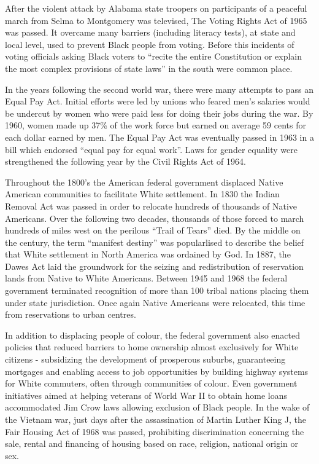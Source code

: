 After the violent attack by Alabama state troopers on participants of a peaceful march from Selma to Montgomery was televised, The Voting Rights Act of 1965 was passed. It overcame many barriers (including literacy tests), at state and local level, used to prevent Black people from voting. Before this incidents of voting officials asking Black voters to ``recite the entire Constitution or explain the most complex provisions of state laws''\cite{LBJ} in the south were common place.

In the years following the second world war, there were many attempts to pass an Equal Pay Act. Initial efforts were led by unions who feared men's salaries would be undercut by women who were paid less for doing their jobs during the war. By 1960, women made up 37\% of the work force but earned on average 59 cents for each dollar earned by men. The Equal Pay Act was eventually passed in 1963 in a bill which endorsed ``equal pay for equal work''. Laws for gender equality were strengthened the following year by the Civil Rights Act of 1964.

Throughout the 1800's the American federal government displaced Native American communities to facilitate White settlement. In 1830 the Indian Removal Act was passed in order to relocate hundreds of thousands of Native Americans. Over the following two decades, thousands of those forced to march hundreds of miles west on the perilous ``Trail of Tears'' died. By the middle on the century, the term ``manifest destiny'' was popularlised to describe the belief that White settlement in North America was ordained by God. In 1887, the Dawes Act laid the groundwork for the seizing and redistribution of reservation lands from Native to White Americans. Between 1945 and 1968 the federal government terminated recognition of more than 100 tribal nations placing them under state jurisdiction. Once again Native Americans were relocated, this time from reservations to urban centres.

In addition to displacing people of colour, the federal government also enacted policies that reduced barriers to home ownership almost exclusively for White citizens - subsidizing the development of prosperous suburbs, guaranteeing mortgages and enabling access to job opportunities by building highway systems for White commuters, often through communities of colour. Even government initiatives aimed at helping veterans of World War II to obtain home loans accommodated Jim Crow laws allowing exclusion of Black people. In the wake of the Vietnam war, just days after the assassination of Martin Luther King J, the Fair Housing Act of 1968 was passed, prohibiting discrimination concerning the sale, rental and financing of housing based on race, religion, national origin or sex.

